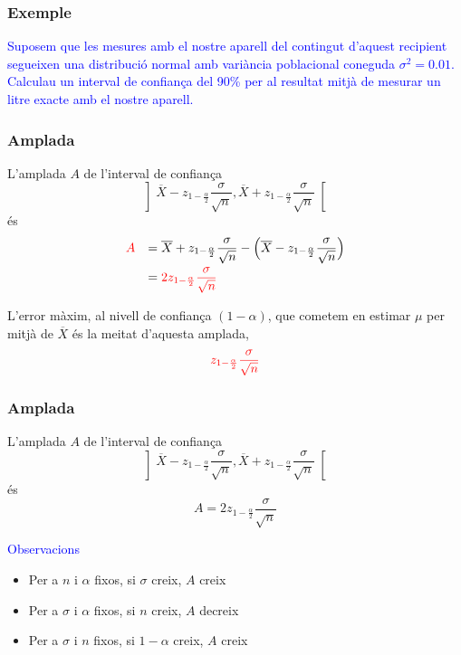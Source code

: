\documentclass[12pt,t]{beamer}
\newcommand{\red}[1]{\textcolor{red}{#1}}
\newcommand{\blue}[1]{\textcolor{blue}{#1}}
\renewcommand{\emph}[1]{{\color{red}#1}}
\theoremstyle{plain}
\theoremstyle{definition}
\begin{document}
\begin{frame}[fragile]
\frametitle{Exemple}
\vspace*{-3ex}

\blue{Suposem que les mesures amb el nostre aparell del contingut d'aquest recipient 
segueixen una distribució normal amb variància poblacional coneguda $\sigma^2=0.01$. Calculau un interval de
confiança del 90\% per al resultat mitjà de mesurar un litre exacte amb el nostre aparell.}

\end{frame}


\begin{frame}
\frametitle{Amplada}

L'\emph{amplada} $A$ de l'interval de confiança 
$$
\left]\overline{X} -z_{1-\frac{\alpha}{2}} \frac{\sigma}{\sqrt{n}}, \overline{X}+z_{1-\frac{\alpha}{2}}\frac{\sigma}{\sqrt{n}}
\right[
$$
és
$$
\begin{array}{rl}
\red{A}& \displaystyle =\overline{X}+ z_{1-\frac{\alpha}{2}}\frac{\sigma}{\sqrt{n}}-\Big(\overline{X} -z_{1-\frac{\alpha}{2}}\frac{\sigma}{\sqrt{n}}\Big)\\[2ex] & \displaystyle =\red{2z_{1-\frac{\alpha}{2}}\frac{\sigma}{\sqrt{n}}}
\end{array}
$$

L'\emph{error màxim}, al nivell de confiança $(1-\alpha)$, que cometem en estimar $\mu$
per mitjà de $\overline{X}$ és la meitat d'aquesta amplada, 
$$
\red{z_{1-\frac{\alpha}{2}}\frac{\sigma}{\sqrt{n}}}
$$
\end{frame}

\begin{frame}
\frametitle{Amplada}

L'\emph{amplada} $A$ de l'interval de confiança 
$$
\left]\overline{X} -z_{1-\frac{\alpha}{2}} \frac{\sigma}{\sqrt{n}}, \overline{X}+z_{1-\frac{\alpha}{2}}\frac{\sigma}{\sqrt{n}}
\right[
$$
és
$$
A= 2z_{1-\frac{\alpha}{2}}\frac{\sigma}{\sqrt{n}}
$$

\blue{Observacions}
\begin{itemize}
\item Per a $n$ i $\alpha$ fixos, si $\sigma$ creix,
 $A$ creix
\smallskip

\item Per a $\sigma$ i $\alpha$ fixos, si $n$
creix,  $A$ decreix
\smallskip

\item Per a $\sigma$ i $n$ fixos, si
$1-\alpha$ creix, $A$ creix
\end{itemize}
\end{frame}
\end{document}

